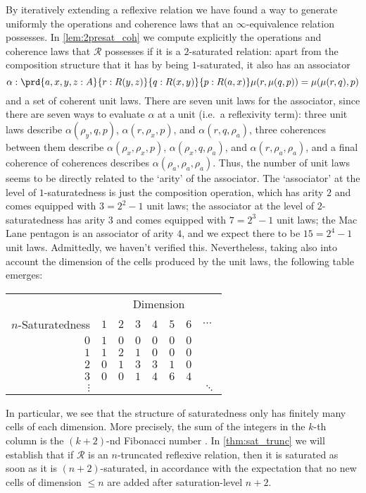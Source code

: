 By iteratively extending a reflexive relation we have found a way to generate uniformly the operations and coherence laws that an $\infty$-equivalence relation possesses. In \cref{lem:2presat_coh} we compute explicitly the operations and coherence laws that $\mathcal{R}$ possesses if it is a $2$-saturated relation: apart from the composition structure that it has by being $1$-saturated, it also has an associator
\begin{equation*}
\alpha : \prd{a,x,y,z:A}{r:R(y,z)}{q:R(x,y)}{p:R(a,x)} \mu(r,\mu(q,p))=\mu(\mu(r,q),p)
\end{equation*}
and a set of coherent unit laws. There are seven unit laws for the associator, since there are seven ways to evaluate $\alpha$ at a unit (i.e.~a reflexivity term): three unit laws describe $\alpha(\rho_y,q,p)$, $\alpha(r,\rho_x,p)$, and $\alpha(r,q,\rho_a)$, three coherences between them describe $\alpha(\rho_x,\rho_x,p)$, $\alpha(\rho_x,q,\rho_a)$, and $\alpha(r,\rho_a,\rho_a)$, and a final coherence of coherences describes $\alpha(\rho_a,\rho_a,\rho_a)$. Thus, the number of unit laws seems to be directly related to the `arity' of the associator. The `associator' at the level of $1$-saturatedness is just the composition operation, which has arity $2$ and comes equipped with $3=2^2-1$ unit laws; the associator at the level of $2$-saturatedness has arity $3$ and comes equipped with $7=2^3-1$ unit laws; the Mac Lane pentagon is an associator of arity $4$, and we expect there to be $15=2^4-1$ unit laws. Admittedly, we haven't verified this. Nevertheless, taking also into account the dimension of the cells produced by the unit laws, the following table emerges:

\begin{center}
\begin{tabular}{r|lllllll}
\toprule
& \multicolumn{7}{c}{Dimension} \\
$n$-Saturatedness & $1$ & $2$ & $3$ & $4$ & $5$ & $6$ & $\cdots$ \\
\midrule 
$0$ & $1$ & $0$ & $0$ & $0$ & $0$ & $0$ & \\
$1$ & $1$ & $2$ & $1$ & $0$ & $0$ & $0$ & \\
$2$ & $0$ & $1$ & $3$ & $3$ & $1$ & $0$ & \\
$3$ & $0$ & $0$ & $1$ & $4$ & $6$ & $4$ & \\
$\vdots$ & & & & & & & $\ddots$
\end{tabular}
\end{center}

In particular, we see that the structure of saturatedness only has finitely many cells of each dimension. More precisely, the sum of the integers in the $k$-th column is the $(k+2)$-nd Fibonacci number \cite[p.~7]{lucas}. In \cref{thm:sat_trunc} we will establish that if $\mathcal{R}$ is an $n$-truncated reflexive relation, then it is saturated as soon as it is $(n+2)$-saturated, in accordance with the expectation that no new cells of dimension $\leq n$ are added after saturation-level $n+2$. 

